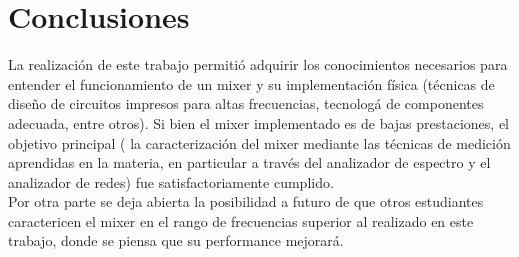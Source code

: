 \documentclass[a4paper,10pt]{article}
\begin{document}
	\section{Conclusiones}
	\indent La realizaci\'on de este trabajo permiti\'o adquirir los 
	conocimientos necesarios para entender el funcionamiento de un mixer y su 
	implementaci\'on f\'isica (t\'ecnicas de dise\~no de circuitos impresos para
	altas frecuencias, tecnolog\'a de componentes adecuada, entre otros). Si 
	bien el mixer implementado es de bajas prestaciones, el objetivo principal (
	la caracterizaci\'on del mixer mediante las t\'ecnicas de medici\'on 
	aprendidas en la materia, en particular a trav\'es del analizador de 
	espectro y el analizador de redes) fue satisfactoriamente cumplido. \\
	\indent Por otra parte se deja abierta la posibilidad a futuro de que otros 
	estudiantes caractericen el mixer en el rango de frecuencias superior al 
	realizado en este trabajo, donde se piensa que su performance mejorar\'a. 
	
	\newpage
\end{document}
